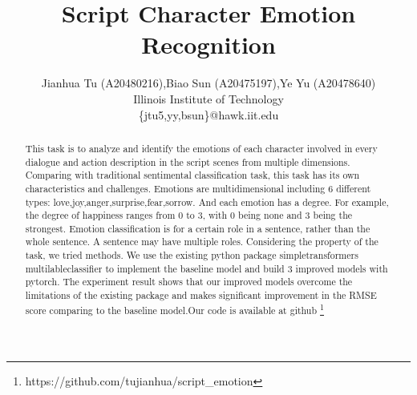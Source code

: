 \documentclass[12pt,twocolumn,letterpaper]{article}
\begin{document}
\title{Script Character Emotion Recognition}

\author{Jianhua Tu (A20480216),Biao Sun (A20475197),Ye Yu (A20478640)\\
Illinois Institute of Technology\\ 
\{jtu5,yy,bsun\}@hawk.iit.edu
}

\maketitle

\begin{abstract}
This task is to analyze and identify the emotions of each character involved in every dialogue and action description in the script scenes from multiple dimensions. Comparing with traditional sentimental classification task, this task has its own characteristics and challenges. Emotions are multidimensional including 6 different types: love,joy,anger,surprise,fear,sorrow. And each emotion has a degree. For example, the degree of happiness ranges from 0 to 3, with 0 being none and 3 being the strongest.  Emotion classification is for a certain role in a sentence, rather than the whole sentence. A sentence may have multiple roles.  Considering the property of the task, we tried methods. We use the existing python package simpletransformers multilableclassifier to implement the baseline model and build 3 improved models with pytorch. The experiment result shows that our improved models overcome the limitations of the existing package and makes significant improvement in the RMSE score comparing to the baseline model.Our code is available at github \footnote{https://github.com/tujianhua/script\_emotion}
\end{abstract}

\end{document}
